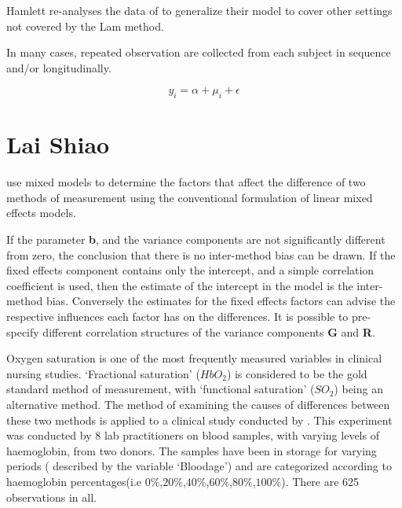 \documentclass[12pt, a4paper]{report}
\theoremstyle{plain}
\theoremstyle{definition}
\theoremstyle{remark}
\begin{document}


Hamlett re-analyses the data of \citet{lam} to generalize their model to cover other settings not covered by the Lam method.

In many cases, repeated observation are collected from each subject in sequence  and/or longitudinally.


\[ y_i = \alpha + \mu_i + \epsilon \]






		\section{Lai Shiao}
		\citet{LaiShiao} use mixed models to determine the factors that
		affect the difference of two methods of measurement using the
		conventional formulation of linear mixed effects models.
		
		If the parameter \textbf{b}, and the variance components are not
		significantly different from zero, the conclusion that there is no
		inter-method bias can be drawn. If the fixed effects component
		contains only the intercept, and a simple correlation coefficient
		is used, then the estimate of the intercept in the model is the
		inter-method bias. Conversely the estimates for the fixed effects
		factors can advise the respective influences each factor has on
		the differences. It is possible to pre-specify different
		correlation structures of the variance components \textbf{G} and
		\textbf{R}.
		
		
		Oxygen saturation is one of the most frequently measured variables
		in clinical nursing studies. `Fractional saturation' ($HbO_{2}$)
		is considered to be the gold standard method of measurement, with
		`functional saturation' ($SO_{2}$) being an alternative method.
		The method of examining the causes of differences between these
		two methods is applied to a clinical study conducted by
		\citet{Shiao}. This experiment was conducted by 8 lab
		practitioners on blood samples, with varying levels of
		haemoglobin, from two donors. The samples have been in storage for
		varying periods ( described by the variable `Bloodage') and are
		categorized according to haemoglobin percentages(i.e
		$0\%$,$20\%$,$40\%$,$60\%$,$80\%$,$100\%$). There are 625
		observations in all.
		
\end{document}
